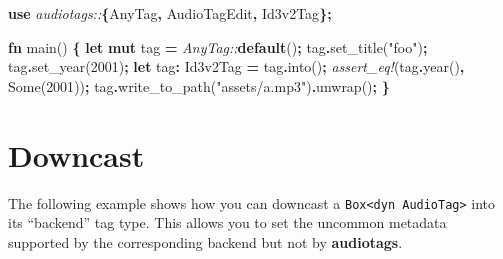 \documentclass[
]{book}
\newenvironment{Shaded}{\begin{snugshade}}{\end{snugshade}}
\newcommand{\ConstantTok}[1]{\textcolor[rgb]{0.00,0.00,0.00}{#1}}
\newcommand{\DecValTok}[1]{\textcolor[rgb]{0.00,0.00,0.81}{#1}}
\newcommand{\KeywordTok}[1]{\textcolor[rgb]{0.13,0.29,0.53}{\textbf{#1}}}
\newcommand{\NormalTok}[1]{#1}
\newcommand{\OperatorTok}[1]{\textcolor[rgb]{0.81,0.36,0.00}{\textbf{#1}}}
\newcommand{\PreprocessorTok}[1]{\textcolor[rgb]{0.56,0.35,0.01}{\textit{#1}}}
\newcommand{\StringTok}[1]{\textcolor[rgb]{0.31,0.60,0.02}{#1}}
\begin{document}
\begin{Shaded}
\begin{Highlighting}[]
\KeywordTok{use} \PreprocessorTok{audiotags::}\OperatorTok{\{}\NormalTok{AnyTag}\OperatorTok{,}\NormalTok{ AudioTagEdit}\OperatorTok{,}\NormalTok{ Id3v2Tag}\OperatorTok{\};}

\KeywordTok{fn}\NormalTok{ main() }\OperatorTok{\{}
    \KeywordTok{let} \KeywordTok{mut}\NormalTok{ tag }\OperatorTok{=} \PreprocessorTok{AnyTag::}\KeywordTok{default}\NormalTok{()}\OperatorTok{;}
\NormalTok{    tag}\OperatorTok{.}\NormalTok{set\_title(}\StringTok{"foo"}\NormalTok{)}\OperatorTok{;}
\NormalTok{    tag}\OperatorTok{.}\NormalTok{set\_year(}\DecValTok{2001}\NormalTok{)}\OperatorTok{;}
    \KeywordTok{let}\NormalTok{ tag}\OperatorTok{:}\NormalTok{ Id3v2Tag }\OperatorTok{=}\NormalTok{ tag}\OperatorTok{.}\NormalTok{into()}\OperatorTok{;}
    \PreprocessorTok{assert\_eq!}\NormalTok{(tag}\OperatorTok{.}\NormalTok{year()}\OperatorTok{,} \ConstantTok{Some}\NormalTok{(}\DecValTok{2001}\NormalTok{))}\OperatorTok{;}
\NormalTok{    tag}\OperatorTok{.}\NormalTok{write\_to\_path(}\StringTok{"assets/a.mp3"}\NormalTok{)}\OperatorTok{.}\NormalTok{unwrap()}\OperatorTok{;}
\OperatorTok{\}}
\end{Highlighting}
\end{Shaded}

\hypertarget{downcast}{%
\chapter{Downcast}\label{downcast}}

The following example shows how you can downcast a \texttt{Box\textless{}dyn\ AudioTag\textgreater{}} into its ``backend'' tag type. This allows you to set the uncommon metadata supported by the corresponding backend but not by \textbf{audiotags}.
\end{document}

